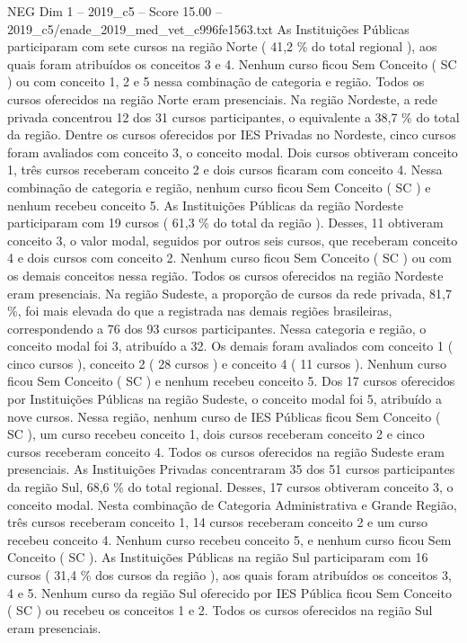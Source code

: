 \begin{textsample}{NEG Dim 1 – 2019\_c5 – Score 15.00 – 2019\_c5/enade\_2019\_med\_vet\_c996fe1563.txt}
As Instituições Públicas participaram com sete cursos na região Norte ( 41,2 \% do total regional ), aos quais foram atribuídos os conceitos 3 e 4.
Nenhum curso ficou Sem Conceito ( SC ) ou com conceito 1, 2 e 5 nessa combinação de categoria e região.
Todos os cursos oferecidos na região Norte eram presenciais.
Na região Nordeste, a rede privada concentrou 12 dos 31 cursos participantes, o equivalente a 38,7 \% do total da região.
Dentre os cursos oferecidos por IES Privadas no Nordeste, cinco cursos foram avaliados com conceito 3, o conceito modal.
Dois cursos obtiveram conceito 1, três cursos receberam conceito 2 e dois cursos ficaram com conceito 4.
Nessa combinação de categoria e região, nenhum curso ficou Sem Conceito ( SC ) e nenhum recebeu conceito 5.
As Instituições Públicas da região Nordeste participaram com 19 cursos ( 61,3 \% do total da região ).
Desses, 11 obtiveram conceito 3, o valor modal, seguidos por outros seis cursos, que receberam conceito 4 e dois cursos com conceito 2.
Nenhum curso ficou Sem Conceito ( SC ) ou com os demais conceitos nessa região.
Todos os cursos oferecidos na região Nordeste eram presenciais.
Na região Sudeste, a proporção de cursos da rede privada, 81,7 \%, foi mais elevada do que a registrada nas demais regiões brasileiras, correspondendo a 76 dos 93 cursos participantes.
Nessa categoria e região, o conceito modal foi 3, atribuído a 32.
Os demais foram avaliados com conceito 1 ( cinco cursos ), conceito 2 ( 28 cursos ) e conceito 4 ( 11 cursos ).
Nenhum curso ficou Sem Conceito ( SC ) e nenhum recebeu conceito 5.
Dos 17 cursos oferecidos por Instituições Públicas na região Sudeste, o conceito modal foi 5, atribuído a nove cursos.
Nessa região, nenhum curso de IES Públicas ficou Sem Conceito ( SC ), um curso recebeu conceito 1, dois cursos receberam conceito 2 e cinco cursos receberam conceito 4.
Todos os cursos oferecidos na região Sudeste eram presenciais.
As Instituições Privadas concentraram 35 dos 51 cursos participantes da região Sul, 68,6 \% do total regional.
Desses, 17 cursos obtiveram conceito 3, o conceito modal.
Nesta combinação de Categoria Administrativa e Grande Região, três cursos receberam conceito 1, 14 cursos receberam conceito 2 e um curso recebeu conceito 4.
Nenhum curso recebeu conceito 5, e nenhum curso ficou Sem Conceito ( SC ).
As Instituições Públicas na região Sul participaram com 16 cursos ( 31,4 \% dos cursos da região ), aos quais foram atribuídos os conceitos 3, 4 e 5.
Nenhum curso da região Sul oferecido por IES Pública ficou Sem Conceito ( SC ) ou recebeu os conceitos 1 e 2.
Todos os cursos oferecidos na região Sul eram presenciais.

\end{textsample}
